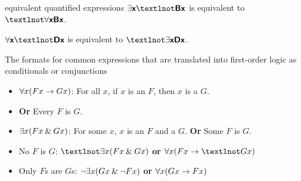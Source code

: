 
\begin{factboxy-width}[width=7cm]{equivalent quantified expressions}
$\exists \meta{x} ¬\meta{Bx} $ is equivalent to $¬\forall \meta{x Bx}$.\medskip

$\forall \meta{x} ¬\meta{Dx}$ is equivalent to $¬\exists \meta{x Dx}$.
\end{factboxy-width}

\begin{factboxy-width}[width=9.6cm]{The formats for common expressions that are translated into first-order logic as conditionals or conjunctions}
\begin{small}
\begin{itemize}
  \setlength{\itemsep}{1pt}
  \setlength{\parskip}{0pt}
  \setlength{\parsep}{0pt}
  \setlength{\itemindent}{-1cm}
\item[] $\forall x(Fx \rightarrow Gx)$: For all $x$, if $x$ is an $F$, then $x$ is a $G$. 
\item[] \hspace{24mm}\textbf{Or} Every $F$ is $G$.\medskip
\item[] $\exists x(Fx \mathbin{\&} Gx)$: For some $x$, $x$ is an $F$ and a $G$. \textbf{Or} Some $F$ is $G$.
\medskip
\item[] No $F$ is $G$: $¬\exists x(Fx \eand Gx) $ \textbf{or} $\forall x(Fx \eif ¬Gx)$\medskip
\item[] Only $F$s are $G$s: ${\neg} \exists x(Gx \mathbin{\&} {\neg} Fx)$ \textbf{or} $\forall x(Gx \rightarrow Fx)$
\end{itemize}
\end{small}
\end{factboxy-width}




